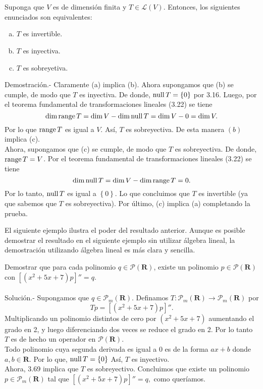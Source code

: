 \setcounter{myteo}{68}
\begin{myteo}\;\\\\
    Suponga que $V$ es de dimensión finita y $T\in \mathcal{L}(V)$. Entonces, los siguientes enunciados son equivalentes:
    \begin{enumerate}[(a)]
	\item $T$ es invertible.
	\item $T$ es inyectiva.
	\item $T$ es sobreyetiva.
    \end{enumerate}
    \vspace{.5cm}
	Demostración.- Claramente (a) implica (b). Ahora supongamos que (b) se cumple, de modo que $T$ es inyectiva. De donde, $\operatorname{null} T=\left\{0\right\}$ por 3.16. Luego, por el teorema fundamental de transformaciones lineales (3.22) se tiene
	$$\dim \operatorname{range} T = \dim V - \dim \operatorname{null} T = \dim V - 0 = \dim V.$$
	Por lo que $\operatorname{range} T$ es igual a $V$. Así, $T$ es sobreyectiva. De esta manera $(b)$ implica (c).\\
	Ahora, supongamos que (c) se cumple, de modo que $T$ es sobreyectiva. De donde, $\operatorname{range} T=V$. Por el teorema fundamental de transformaciones lineales (3.22) se tiene
	$$\dim \operatorname{null} T = \dim V - \dim \operatorname{range} T = 0.$$
	Por lo tanto, $\operatorname{null} T$ es igual a $\left\{0\right\}$. Lo que concluimos que $T$ es invertible (ya que sabemos que $T$ es sobreyectiva). Por último, (c) implica (a) completando la prueba.
\end{myteo}

El siguiente ejemplo ilustra el poder del resultado anterior. Aunque es posible demostrar el resultado en el siguiente ejemplo sin utilizar álgebra lineal, la demostración utilizando álgebra lineal es más clara y sencilla.

\begin{myejem}
    Demostrar que para cada polinomio $q\in \mathcal{P}(\textbf{R})$, existe un polinomio $p\in \mathcal{P}(\textbf{R})$ con $\left[\left(x^2+5x+7\right)p\right]''=q$.\\\\
	Solución.-\; Supongamos que $q\in \mathcal{P}_m(\textbf{R})$. Definamos $T:\mathcal{P}_m(\textbf{R})\to \mathcal{P}_m(\textbf{R})$ por
	$$Tp=\left[\left(x^2+5x+7\right)p\right]''.$$
	Multiplicando un polinomio distintos de cero por $\left(x^2+5x+7\right)$ aumentando el grado en 2, y luego diferenciando dos veces se reduce el grado en 2. Por lo tanto $T$ es de hecho un operador en $\mathcal{P}(\textbf{R})$.\\
	Todo polinomio cuya segunda derivada es igual a $0$ es de la forma $ax+b$ donde $a,b\in \textbf{R}$. Por lo que, $\operatorname{null} T=\left\{0\right\}$ Así, $T$ es inyectivo.\\
	Ahora, 3.69 implica que $T$ es sobreyectivo. Concluimos que existe un polinomio $p\in \mathcal{P}_m(\textbf{R})$ tal que $\left[\left(x^2+5x+7\right)p\right]''=q,$ como queríamos.
\end{myejem}



